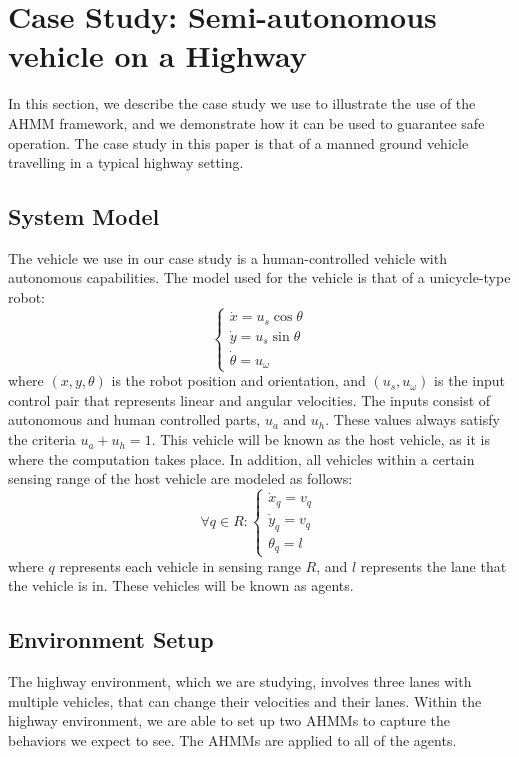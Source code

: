 \documentclass[conference]{IEEEtran}
\begin{document}
\section{Case Study: Semi-autonomous vehicle on a Highway}
In this section, we describe the case study we use to illustrate the use of the AHMM framework, and we demonstrate how it can be used to guarantee safe operation. The case study in this paper is that of a manned ground vehicle travelling in a typical highway setting.

\subsection{System Model}
The vehicle we use in our case study is a human-controlled vehicle with autonomous capabilities. The model used for the vehicle is that of a unicycle-type robot:
\begin{equation}
    \begin{cases}
    \dot{x} = u_s\cos{\theta} \\
    \dot{y} = u_s\sin{\theta} \\
    \dot{\theta} = u_\omega
    \end{cases}
\end{equation}
where $(x,y,\theta)$ is the robot position and orientation, and $(u_s,u_\omega)$ is the input control pair that represents linear and angular velocities. The inputs consist of autonomous and human controlled parts, $u_a$ and $u_h$. These values always satisfy the criteria $u_a+u_h = 1$. This vehicle will be known as the host vehicle, as it is where the computation takes place. In addition, all vehicles within a certain sensing range of the host vehicle are modeled as follows:
\begin{equation} \label{eq:agentpos}
    \forall q \in R:
    \begin{cases}
    \dot{x}_q = v_q \\
    \dot{y}_q = v_q\ \\
    \theta_q = l
    \end{cases}
\end{equation}
where $q$ represents each vehicle in sensing range $R$, and $l$ represents the lane that the vehicle is in. These vehicles will be known as agents.

\subsection{Environment Setup}
The highway environment, which we are studying, involves three lanes with multiple vehicles, that can change their velocities and their lanes. Within the highway environment, we are able to set up two AHMMs to capture the behaviors we expect to see. The AHMMs are applied to all of the agents.
\end{document}
